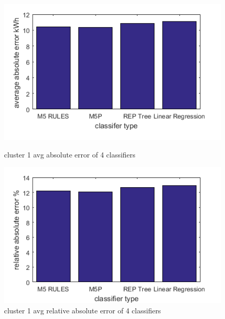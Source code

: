 \begin{figure}
\centering
\begin{minipage}{.5\textwidth}
  \centering
  \includegraphics[width=\linewidth]{cluster-1-diff-classifier-avg-abs.png}
  \caption{cluster 1 avg absolute error of 4 classifiers}
  \label{fig:cluster-1-predictors}
\end{minipage}%
\begin{minipage}{.5\textwidth}
  \centering
  \includegraphics[width=\linewidth]{cluster-1-diff-classifier-relative-abs.png}
  \caption{cluster 1 avg relative absolute error of 4 classifiers}
\end{minipage}

\end{figure}

